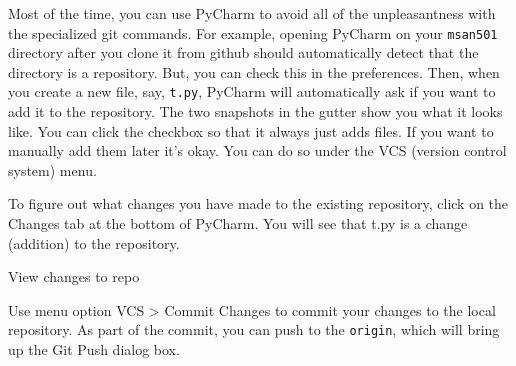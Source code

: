 \documentclass[titlepage]{tufte-book}
\begin{document}
Most of the time, you can use PyCharm to avoid all of the unpleasantness with the specialized git commands. For example, opening PyCharm on your {\tt msan501} directory after you clone it from github should automatically detect that the directory is a repository. But, you can check this in the preferences. Then, when you create a new file, say, {\tt t.py}, PyCharm will automatically ask if you want to add it to the repository. The two snapshots in the gutter show you what it looks like. You can click the checkbox so that it always just adds files. If you want to manually add them later it's okay. You can do so under the VCS (version control system) menu.

To figure out what changes you have made to the existing repository, click on the Changes tab at the bottom of PyCharm. You will see that t.py is a change (addition) to the repository.

\begin{marginfigure}
\begin{center}
\end{center}
\caption{View changes to repo}
\end{marginfigure}

Use menu option VCS > Commit Changes to commit your changes to the local repository.   As part of the commit, you can push to the {\tt origin}, which will bring up the Git Push dialog box.
\vspace{5mm}
\end{document}
